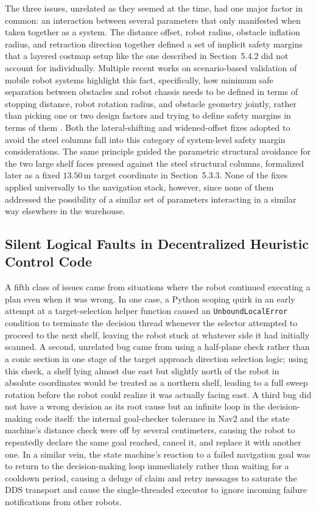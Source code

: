 The three issues, unrelated as they seemed at the time, had one major factor in common: an interaction between several parameters that only manifested when taken together as a system. The distance offset, robot radius, obstacle inflation radius, and retraction direction together defined a set of implicit safety margins that a layered costmap setup like the one described in Section~5.4.2 \cite{macenski2023survey} did not account for individually. Multiple recent works on scenario-based validation of mobile robot systems highlight this fact, specifically, how minimum safe separation between obstacles and robot chassis needs to be defined in terms of stopping distance, robot rotation radius, and obstacle geometry jointly, rather than picking one or two design factors and trying to define safety margins in terms of them \cite{pasch2026robovast}. Both the lateral-shifting and widened-offset fixes adopted to avoid the steel columns fall into this category of system-level safety margin considerations. The same principle guided the parametric structural avoidance for the two large shelf faces pressed against the steel structural columns, formalized later as a fixed $13.50\,\text{m}$ target coordinate in Section~5.3.3. None of the fixes applied universally to the navigation stack, however, since none of them addressed the possibility of a similar set of parameters interacting in a similar way elsewhere in the warehouse.

\subsection{Silent Logical Faults in Decentralized Heuristic Control Code}

A fifth class of issues came from situations where the robot continued executing a plan even when it was wrong. In one case, a Python scoping quirk in an early attempt at a target-selection helper function caused an \texttt{UnboundLocalError} condition to terminate the decision thread whenever the selector attempted to proceed to the next shelf, leaving the robot stuck at whatever side it had initially scanned. A second, unrelated bug came from using a half-plane check rather than a conic section in one stage of the target approach direction selection logic; using this check, a shelf lying almost due east but slightly north of the robot in absolute coordinates would be treated as a northern shelf, leading to a full sweep rotation before the robot could realize it was actually facing east. A third bug did not have a wrong decision as its root cause but an infinite loop in the decision-making code itself: the internal goal-checker tolerance in Nav2 and the state machine's distance check were off by several centimeters, causing the robot to repeatedly declare the same goal reached, cancel it, and replace it with another one. In a similar vein, the state machine's reaction to a failed navigation goal was to return to the decision-making loop immediately rather than waiting for a cooldown period, causing a deluge of claim and retry messages to saturate the DDS transport and cause the single-threaded executor to ignore incoming failure notifications from other robots.

